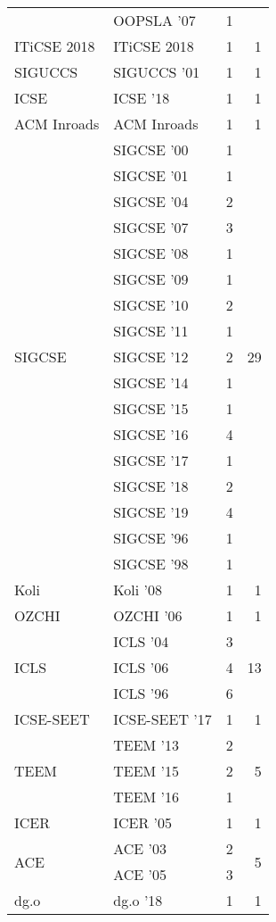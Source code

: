\begin{table*}[t]
\begin{tabular}{llrr}
& OOPSLA '07 & 1 &\\
\multirow{1}{*}{ITiCSE 2018} & ITiCSE 2018 & 1 & \multirow{1}{*}{1}\\
\multirow{1}{*}{SIGUCCS } & SIGUCCS '01 & 1 & \multirow{1}{*}{1}\\
\multirow{1}{*}{ICSE } & ICSE '18 & 1 & \multirow{1}{*}{1}\\
\multirow{1}{*}{ACM Inroads} & ACM Inroads & 1 & \multirow{1}{*}{1}\\
\multirow{17}{*}{SIGCSE } & SIGCSE '00 & 1 & \multirow{17}{*}{29}\\
& SIGCSE '01 & 1 &\\
& SIGCSE '04 & 2 &\\
& SIGCSE '07 & 3 &\\
& SIGCSE '08 & 1 &\\
& SIGCSE '09 & 1 &\\
& SIGCSE '10 & 2 &\\
& SIGCSE '11 & 1 &\\
& SIGCSE '12 & 2 &\\
& SIGCSE '14 & 1 &\\
& SIGCSE '15 & 1 &\\
& SIGCSE '16 & 4 &\\
& SIGCSE '17 & 1 &\\
& SIGCSE '18 & 2 &\\
& SIGCSE '19 & 4 &\\
& SIGCSE '96 & 1 &\\
& SIGCSE '98 & 1 &\\
\multirow{1}{*}{Koli } & Koli '08 & 1 & \multirow{1}{*}{1}\\
\multirow{1}{*}{OZCHI } & OZCHI '06 & 1 & \multirow{1}{*}{1}\\
\multirow{3}{*}{ICLS } & ICLS '04 & 3 & \multirow{3}{*}{13}\\
& ICLS '06 & 4 &\\
& ICLS '96 & 6 &\\
\multirow{1}{*}{ICSE-SEET } & ICSE-SEET '17 & 1 & \multirow{1}{*}{1}\\
\multirow{3}{*}{TEEM } & TEEM '13 & 2 & \multirow{3}{*}{5}\\
& TEEM '15 & 2 &\\
& TEEM '16 & 1 &\\
\multirow{1}{*}{ICER } & ICER '05 & 1 & \multirow{1}{*}{1}\\
\multirow{2}{*}{ACE } & ACE '03 & 2 & \multirow{2}{*}{5}\\
& ACE '05 & 3 &\\
\multirow{1}{*}{dg.o } & dg.o '18 & 1 & \multirow{1}{*}{1}\\

\end{tabular}
\end{table*}
